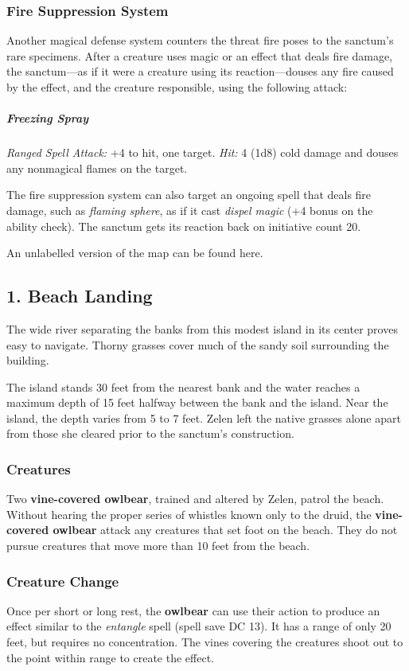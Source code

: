 \documentclass[10pt,a4paper,twoside,bg=print,twocolumn,openany,nodeprecatedcode]{dndbook}
\begin{document}
\subsubsection{Fire Suppression System}
Another magical defense system counters the threat fire poses to the sanctum's rare specimens. After a creature uses magic or an effect that deals fire damage, the sanctum—as if it were a creature using its reaction—douses any fire caused by the effect, and the creature responsible, using the following attack:

\subparagraph{Freezing Spray}
\textsl{Ranged Spell Attack:} +4 to hit, one target. \textsl{Hit:} 4 (1d8) cold damage and douses any nonmagical flames on the target.

The fire suppression system can also target an ongoing spell that deals fire damage, such as \textit{flaming sphere}, as if it cast \textit{dispel magic} (+4 bonus on the ability check). The sanctum gets its reaction back on initiative count 20.

An unlabelled version of the map can be found here.

\subsection{1. Beach Landing}
\begin{DndReadAloud}{}
The wide river separating the banks from this modest island in its center proves easy to navigate. Thorny grasses cover much of the sandy soil surrounding the building.

\end{DndReadAloud}

The island stands 30 feet from the nearest bank and the water reaches a maximum depth of 15 feet halfway between the bank and the island. Near the island, the depth varies from 5 to 7 feet. Zelen left the native grasses alone apart from those she cleared prior to the sanctum's construction.

\subsubsection{Creatures}
Two \textbf{vine-covered owlbear}, trained and altered by Zelen, patrol the beach. Without hearing the proper series of whistles known only to the druid, the \textbf{vine-covered owlbear} attack any creatures that set foot on the beach. They do not pursue creatures that move more than 10 feet from the beach.

\subsubsection{Creature Change}
Once per short or long rest, the \textbf{owlbear} can use their action to produce an effect similar to the \textit{entangle} spell (spell save DC 13). It has a range of only 20 feet, but requires no concentration. The vines covering the creatures shoot out to the point within range to create the effect.
\end{document}
